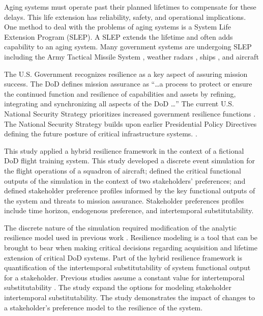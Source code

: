 \documentclass[preprint,12pt]{elsarticle}
\begin{document}
Aging systems must operate past
their planned lifetimes to compensate for these delays. This life extension has
reliability, safety, and operational implications. One method to deal
with the problems of aging systems is a System Life Extension
Program (SLEP). A SLEP extends the lifetime and often adds capability
to an aging system. Many government systems are undergoing SLEP including the Army
Tactical Missile System \cite{DOTE2017,zacks2015}, weather radars
\cite{ROC2018}, ships 
\cite{eckstein2018,NAVSEA2018}, and aircraft
\cite{Lockheed2017,Garbarino2018,Tirpak2015,jennings2018}

The U.S. Government recognizes resilience as a key aspect of assuring
mission success.  The DoD
defines mission assurance as ``\ldots a process to 
protect or ensure the continued function and resilience of
capabilities and assets by refining, integrating and synchronizing all
aspects of the DoD \ldots'' \cite{DepartmentofDefense2016a} The
current U.S. National Security  
Strategy prioritizes increased government resilience functions
\cite{Trump2017}. The National Security Strategy builds upon
earlier Presidential Policy Directives defining the future posture of
critical infrastructure systems. \cite{PPD8,PPD21}. 

This study applied a hybrid resilience framework
\cite{Ayyub2014a,Ayyub2015,Emanuel2017,Emanuel2018} in the context of
a fictional DoD flight training system. This study developed a
discrete event simulation for the flight operations of a squadron of
aircraft; defined the critical functional outputs of the simulation
in the context of two stakeholders' preferences; and defined
stakeholder preference profiles informed by the key functional outputs
of the system and threats to mission assurance. Stakeholder
preferences profiles include
time horizon, endogenous preference, and intertemporal
substitutability.

The discrete nature of the simulation required
modification of the analytic resilience model used in previous work
\cite{Ayyub2014a,Ayyub2015,Emanuel2017,Emanuel2018}.  
Resilience modeling is a tool that can be brought to bear when making 
critical decisions regarding acquisition and lifetime extension of
critical DoD systems. Part of the
hybrid resilience framework is quantification of 
the intertemporal substitutability of system functional output for a
stakeholder. Previous studies  assume a
constant value for intertemporal substitutability
\cite{Emanuel2017,Emanuel2018}. The study  expand the options for
modeling stakeholder intertemporal substitutability. The study
demonstrates the impact of changes to a stakeholder's preference model
to the resilience of the system. 
\end{document}
